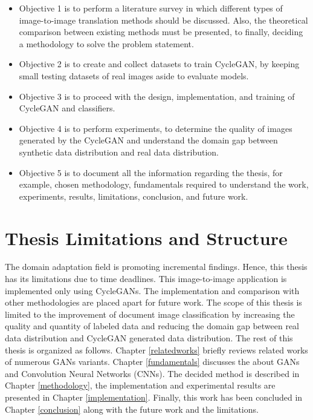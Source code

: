 \begin{itemize}
  \item Objective 1 is to perform a literature survey in which different types of image-to-image translation methods should be discussed. Also, the theoretical comparison between existing methods must be presented, to finally, deciding a methodology to solve the problem statement.
 
  \item Objective 2 is to create and collect datasets to train \ac{CycleGAN}, by keeping small testing datasets of real images aside to evaluate models.
 
  \item Objective 3 is to proceed with the design, implementation, and training of \ac{CycleGAN} and classifiers.
  
  \item Objective 4 is to perform experiments, to determine the quality of images generated by the \ac{CycleGAN} and understand the domain gap between synthetic data distribution and real data distribution.
  
  \item Objective 5 is to document all the information regarding the thesis, for example, chosen methodology, fundamentals required to understand the work, experiments, results, limitations, conclusion, and future work.
    
\end{itemize}








\section{Thesis Limitations and Structure}\label{thesisstructurelimitations}

The domain adaptation field is promoting incremental findings. Hence, this thesis has its limitations due to time deadlines. This image-to-image application is implemented only using \acp{CycleGAN}. The implementation and comparison with other methodologies are placed apart for future work. The scope of this thesis is limited to the improvement of document image classification by increasing the quality and quantity of labeled data and reducing the domain gap between real data distribution and \ac{CycleGAN} generated data distribution. The rest of this thesis is organized as follows. Chapter \ref{relatedworks} briefly reviews related works of numerous \acp{GAN} variants. Chapter \ref{fundamentals} discusses the about \acp{GAN} and Convolution Neural Networks (CNNs). The decided method is described in Chapter \ref{methodology}, the implementation and experimental results are presented in Chapter \ref{implementation}. Finally, this work has been concluded in Chapter \ref{conclusion} along with the future work and the limitations.




